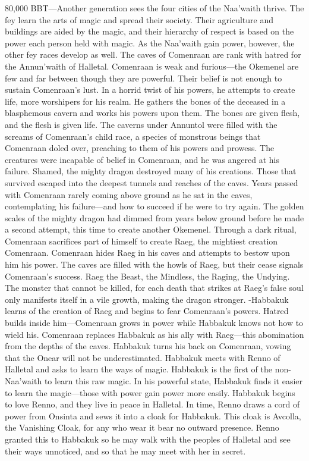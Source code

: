 \documentclass[smalldemyvopaper,11pt,twoside,onecolumn,openright,extrafontsizes]{memoir}
\begin{document}
{{80,000 BBT—Another generation sees the four cities of the Naa’waith thrive. The fey learn the arts of magic and spread their society. Their agriculture and buildings are aided by the magic, and their hierarchy of respect is based on the power each person held with magic. As the Naa’waith gain power, however, the other fey races develop as well. The caves of Comenraan are rank with hatred for the Annun’waith of Halletal. Comenraan is weak and furious—the Okemenel are few and far between though they are powerful. Their belief is not enough to sustain Comenraan’s lust. In a horrid twist of his powers, he attempts to create life, more worshipers for his realm. He gathers the bones of the deceased in a blasphemous cavern and works his powers upon them. The bones are given flesh, and the flesh is given life. The caverns under Annuntol were filled with the screams of Comenraan’s child race, a species of monstrous beings that Comenraan doled over, preaching to them of his powers and prowess. The creatures were incapable of belief in Comenraan, and he was angered at his failure. Shamed, the mighty dragon destroyed many of his creations. Those that survived escaped into the deepest tunnels and reaches of the caves. Years passed with Comenraan rarely coming above ground as he sat in the caves, contemplating his failure—and how to succeed if he were to try again. The golden scales of the mighty dragon had dimmed from years below ground before he made a second attempt, this time to create another Okemenel. Through a dark ritual, Comenraan sacrifices part of himself to create Raeg, the mightiest creation Comenraan. Comenraan hides Raeg in his caves and attempts to bestow upon him his power. The caves are filled with the howls of Raeg, but their cease signals Comenraan’s success. Raeg the Beast, the Mindless, the Raging, the Undying. The monster that cannot be killed, for each death that strikes at Raeg’s false soul only manifests itself in a vile growth, making the dragon stronger.
-Habbakuk learns of the creation of Raeg and begins to fear Comenraan’s powers. Hatred 
builds inside him—Comenraan grows in power while Habbakuk knows not how to wield his. Comenraan replaces Habbakuk as his ally with Raeg—this abomination from the depths of the caves. Habbakuk turns his back on Comenraan, vowing that the Onear will not be underestimated. Habbakuk meets with Renno of Halletal and asks to learn the ways of magic. Habbakuk is the first of the non-Naa’waith to learn this raw magic. In his powerful state, Habbakuk finds it easier to learn the magic—those with power gain power more easily. Habbakuk begins to love Renno, and they live in peace in Halletal. In time, Renno draws a cord of power from Onsinta and sews it into a cloak for Habbakuk. This cloak is Avcolla, the Vanishing Cloak, for any who wear it bear no outward presence. Renno granted this to Habbakuk so he may walk with the peoples of Halletal and see their ways unnoticed, and so that he may meet with her in secret.
}}
\end{document}
